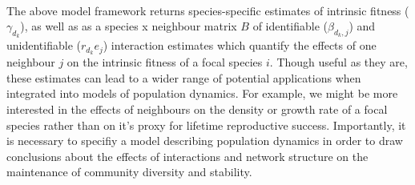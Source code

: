 \documentclass[a4,12pt]{article}
\begin{document}
        \paragraph{}
        The above model framework returns species-specific estimates of intrinsic fitness ($\gamma_{d_k}$), as well as as a species x neighbour matrix $B$ of identifiable ($\beta_{d_k, j}$) and unidentifiable ($r_{d_k} e_j$) interaction estimates which quantify the effects of one neighbour $j$ on the intrinsic fitness of a focal species $i$. Though useful as they are, these estimates can lead to a wider range of potential applications when integrated into models of population dynamics. For example, we might be more interested in the effects of neighbours on the density or growth rate of a focal species rather than on it's proxy for lifetime reproductive success. Importantly, it is necessary to specifiy a model describing population dynamics in order to draw conclusions about the effects of interactions and network structure on the maintenance of community diversity and stability. 
\end{document}

